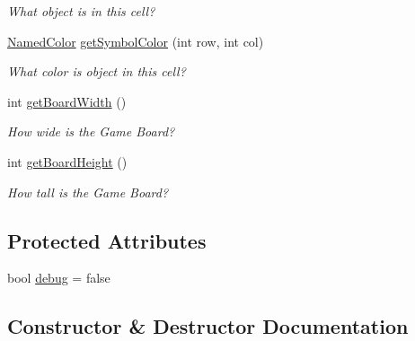 \begin{DoxyCompactItemize}
\begin{DoxyCompactList}\small\item\em What object is in this cell? \end{DoxyCompactList}\item 
\mbox{\hyperlink{namespacebridges_1_1game_afaa832a4322b25b6a4ebfba832f10f26}{Named\+Color}} \mbox{\hyperlink{classbridges_1_1game_1_1_game_base_a26c9f9547cc6f992a829ce5d6edd8f85}{get\+Symbol\+Color}} (int row, int col)
\begin{DoxyCompactList}\small\item\em What color is object in this cell? \end{DoxyCompactList}\item 
int \mbox{\hyperlink{classbridges_1_1game_1_1_game_base_ad74bf992cced25e9997fbf8a63bf8157}{get\+Board\+Width}} ()
\begin{DoxyCompactList}\small\item\em How wide is the Game Board? \end{DoxyCompactList}\item 
int \mbox{\hyperlink{classbridges_1_1game_1_1_game_base_a14510d6685e0b224c8995e397ad64adc}{get\+Board\+Height}} ()
\begin{DoxyCompactList}\small\item\em How tall is the Game Board? \end{DoxyCompactList}\end{DoxyCompactItemize}
\subsection*{Protected Attributes}
\begin{DoxyCompactItemize}
\item 
bool \mbox{\hyperlink{classbridges_1_1game_1_1_game_base_ad2af01edd927a31613d3b881286541bb}{debug}} = false
\end{DoxyCompactItemize}


\subsection{Constructor \& Destructor Documentation}
\mbox{\label{classbridges_1_1game_1_1_game_base_abd73825c57a10d28191a3f1162eb9bd8}} 
